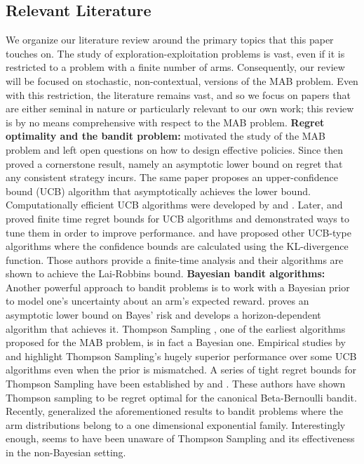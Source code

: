 \subsection{Relevant Literature}
We organize our literature review around the primary topics that this paper touches on. The study of exploration-exploitation problems is vast, even if it is restricted to a problem with a finite number of arms. Consequently, our review will be focused on stochastic, non-contextual, versions of the MAB problem. Even with this restriction, the literature remains vast, and so we focus on papers that are either seminal in nature or particularly relevant to our own work; this review is by no means comprehensive with respect to the MAB problem. 
\newline
\noindent\textbf{\textsf{Regret optimality and the bandit problem: }}\cite{robbins1952some} motivated the study of the MAB problem and left open questions on how to design effective policies. Since then \cite{lai1985asymptotically} proved a cornerstone result, namely an asymptotic lower bound on regret that any consistent strategy incurs. The same paper proposes an upper-confidence bound (UCB) algorithm that asymptotically achieves the lower bound. Computationally efficient UCB algorithms were developed by \cite{agrawal1995sample} and \cite{katehakis1995sequential}. Later, \cite{auer2002finite} and \cite{audibert2010regret} proved finite time regret bounds for UCB algorithms and demonstrated ways to tune them in order to improve performance. \cite{garivier2011kl} and \cite{maillard2011finite} have proposed other UCB-type algorithms where the confidence bounds are calculated using the KL-divergence function. Those authors provide a finite-time analysis and their algorithms are shown to achieve the Lai-Robbins bound.
\newline
\noindent\textbf{\textsf{Bayesian bandit algorithms: }} Another powerful approach to bandit problems is to work with a Bayesian prior to model one's uncertainty about an arm's expected reward. \cite{lai1987adaptive}  proves an asymptotic lower bound on Bayes' risk and develops a horizon-dependent algorithm that achieves it.
Thompson Sampling \citep{thompson1933likelihood}, one of the earliest algorithms proposed for the MAB problem, is in fact a Bayesian one. Empirical studies by \cite{chapelle2011empirical} and \cite{scott2010modern} highlight Thompson Sampling's hugely superior performance over some UCB algorithms even when the prior is mismatched. A series of tight regret bounds for Thompson Sampling have been established by \cite{agrawalanalysis,agrawal2013further} and \cite{kaufmann2012thompson}. These authors have shown Thompson sampling to be regret optimal for the canonical Beta-Bernoulli bandit. Recently, \cite{korda2013thompson} generalized the aforementioned results to bandit problems where the arm distributions belong to a one dimensional exponential family. Interestingly enough, \cite{robbins1952some} seems to have been unaware of Thompson Sampling and its effectiveness in the non-Bayesian setting.

